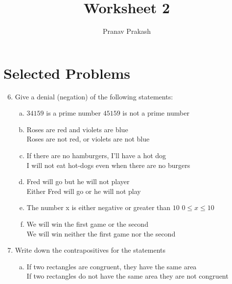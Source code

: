 \documentclass[]{article}
\begin{document}
\title{Worksheet 2}
\author{Pranav Prakash}
\maketitle

\newcommand\answerbox[2][1.25in]{\hspace*{\fill}[\makebox[#1]{#2}]}
\newcommand*\xor{\oplus}

\section {Selected Problems}

\begin{enumerate}
	\setcounter{enumi}{5}
	\item Give a denial (negation) of the following statements:
	\begin{enumerate}[(a)]
		\item $34159$ is a prime number
			\hspace*{\fill} $45159$ is not a prime number
		\item Roses are red and violets are blue \\
			\hspace*{\fill} Roses are not red, or violets are not blue
		\item If there are no hamburgers, I'll have a hot dog \\
			\hspace*{\fill} I will not eat hot-dogs even when there are no burgers
		\item Fred will go but he will not player \\
			\hspace*{\fill} Either Fred will go or he will not play
		\item The number x is either negative or greater than $10$
			\hspace*{\fill} $0 \leq x \leq 10$
		\item We will win the first game or the second \\
			\hspace*{\fill} We will win neither the first game nor the second
	\end{enumerate}
	\setcounter{enumi}{5}
	\item Write down the contrapositives for the statements
	\begin{enumerate}[(a)]
		\item If two rectangles are congruent, they have the same area \\
			\hspace*{\fill} If two rectangles do not have the same area they are not congruent

\end{enumerate}
\end{enumerate}
\end{document}
